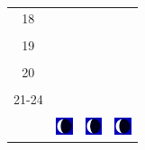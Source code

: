\documentclass[twoside, a4paper,12pt, tikz]{scrartcl}
\begin{document}
\begin{tabularx}{\linewidth}{|c|X|X|X|}
        &   &       &    \\
      \hline
      18&   &       &    \\
        &   &       &    \\
      \hline
      19&   &       &    \\
        &   &       &    \\
      \hline
      20&   &       &    \\
        &   &       &    \\
      \hline
      21-24&   &       &    \\
        &   &       &    \\
      \hline  
      & \vspace{0.01cm} \centerline{\includegraphics[width=0.5cm]{moon_phases/Moon_phase_7.svg.png}} \vspace{0.1cm} & \vspace{0.01cm} \centerline{\includegraphics[width=0.5cm]{moon_phases/Moon_phase_7.svg.png}} \vspace{0.1cm} & \vspace{0.01cm} \centerline{\includegraphics[width=0.5cm]{moon_phases/Moon_phase_7.svg.png}} \vspace{0.1cm}\\
      \hline   
    \end{tabularx}




    \newpage

        \noindent
\end{document}
